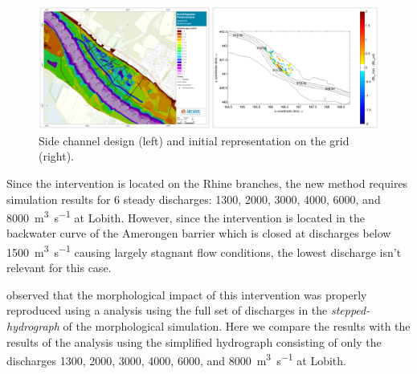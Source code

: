 \begin{figure}
\includegraphics[width=\columnwidth]{figures/Palmerswaard_proj.png}
\caption{Side channel design (left) and initial representation on the grid (right).}
\label{Palmers_proj}
\end{figure}

Since the intervention is located on the Rhine branches, the new \dfmi method requires simulation results for 6 steady discharges: 1300, 2000, 3000, 4000, 6000, and \SI{8000}{\metre\cubed\per\second} at Lobith.
However, since the intervention is located in the backwater curve of the Amerongen barrier which is closed at discharges below \SI{1500}{\metre\cubed\per\second} causing largely stagnant flow conditions, the lowest discharge isn't relevant for this case.

\citet{GiriJagers2022} observed that the morphological impact of this intervention was properly reproduced using a \dfmi analysis using the full set of discharges in the \emph{stepped-hydrograph} of the morphological simulation.
Here we compare the results with the results of the \dfmi analysis using the simplified hydrograph consisting of only the discharges 1300, 2000, 3000, 4000, 6000, and \SI{8000}{\metre\cubed\per\second} at Lobith.

